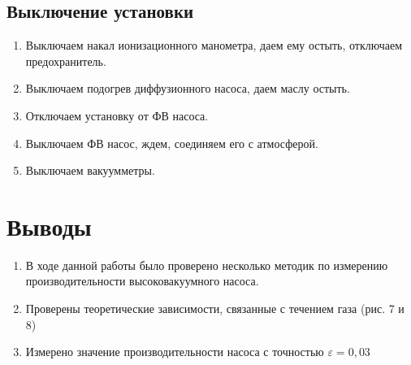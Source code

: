 \documentclass[12pt,a4paper]{article}
\begin{document}
\subsection*{Выключение установки}
\begin{enumerate}
	\item Выключаем накал ионизационного манометра, даем ему остыть, отключаем предохранитель.
	\item Выключаем подогрев диффузионного насоса, даем маслу остыть.
	\item Отключаем установку от ФВ насоса.
	\item Выключаем ФВ насос, ждем, соединяем его с атмосферой.
	\item Выключаем вакуумметры.
\end{enumerate}


\section{Выводы}
\begin{enumerate}
	\item В ходе данной работы было проверено несколько методик по измерению производительности высоковакуумного насоса.
	\item Проверены теоретические зависимости, связанные с течением газа (рис. 7 и 8)
	\item Измерено значение производительности насоса с точностью $\varepsilon = 0,03$
\end{enumerate}
\end{document}
